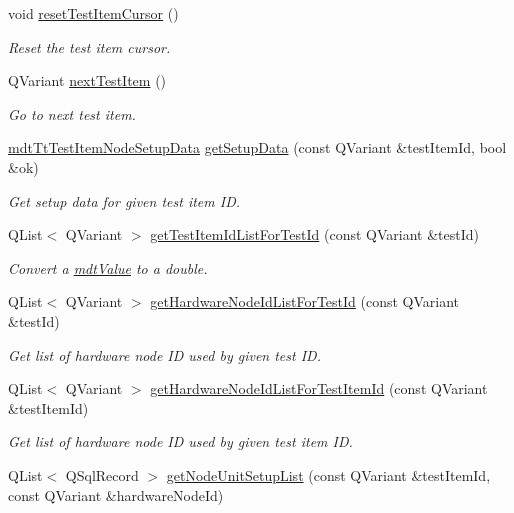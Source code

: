 \begin{DoxyCompactItemize}
void \hyperlink{classmdt_tt_test_ae8cafeb9cebf1c11ca136a94ba75020c}{reset\-Test\-Item\-Cursor} ()
\begin{DoxyCompactList}\small\item\em Reset the test item cursor. \end{DoxyCompactList}\item 
Q\-Variant \hyperlink{classmdt_tt_test_aeec72867e84e374f1366e7a9e0c399a8}{next\-Test\-Item} ()
\begin{DoxyCompactList}\small\item\em Go to next test item. \end{DoxyCompactList}\item 
\hyperlink{classmdt_tt_test_item_node_setup_data}{mdt\-Tt\-Test\-Item\-Node\-Setup\-Data} \hyperlink{classmdt_tt_test_adc22aa88e121f46692b41fbde5a61dc1}{get\-Setup\-Data} (const Q\-Variant \&test\-Item\-Id, bool \&ok)
\begin{DoxyCompactList}\small\item\em Get setup data for given test item I\-D. \end{DoxyCompactList}\item 
Q\-List$<$ Q\-Variant $>$ \hyperlink{classmdt_tt_test_aa1a0dd591e8c8e013d0812823a0382d3}{get\-Test\-Item\-Id\-List\-For\-Test\-Id} (const Q\-Variant \&test\-Id)
\begin{DoxyCompactList}\small\item\em Convert a \hyperlink{classmdt_value}{mdt\-Value} to a double. \end{DoxyCompactList}\item 
Q\-List$<$ Q\-Variant $>$ \hyperlink{classmdt_tt_test_a2c39b2ad814816be6628dff15cdefddc}{get\-Hardware\-Node\-Id\-List\-For\-Test\-Id} (const Q\-Variant \&test\-Id)
\begin{DoxyCompactList}\small\item\em Get list of hardware node I\-D used by given test I\-D. \end{DoxyCompactList}\item 
Q\-List$<$ Q\-Variant $>$ \hyperlink{classmdt_tt_test_a55f82aed4cba7c4a989853d8a0cd1fd6}{get\-Hardware\-Node\-Id\-List\-For\-Test\-Item\-Id} (const Q\-Variant \&test\-Item\-Id)
\begin{DoxyCompactList}\small\item\em Get list of hardware node I\-D used by given test item I\-D. \end{DoxyCompactList}\item 
Q\-List$<$ Q\-Sql\-Record $>$ \hyperlink{classmdt_tt_test_a3f9a35da94544a9dc427a8ad75616a4c}{get\-Node\-Unit\-Setup\-List} (const Q\-Variant \&test\-Item\-Id, const Q\-Variant \&hardware\-Node\-Id)

\end{DoxyCompactItemize}
